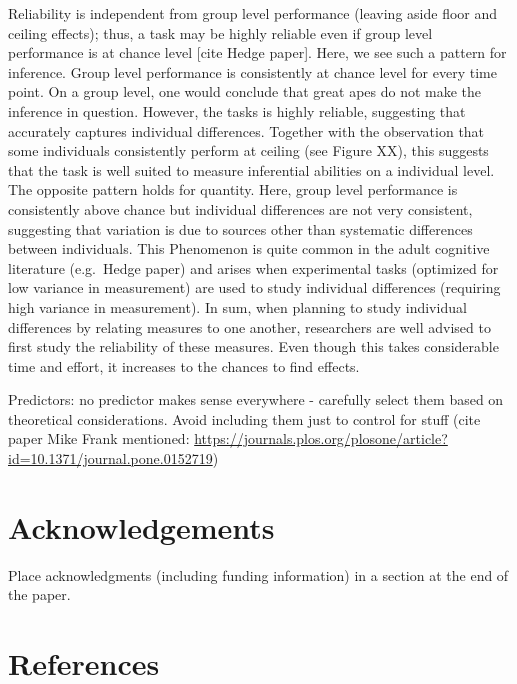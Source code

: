 \documentclass[10pt, letterpaper]{article}
\begin{document}
Reliability is independent from group level performance (leaving aside
floor and ceiling effects); thus, a task may be highly reliable even if
group level performance is at chance level {[}cite Hedge paper{]}. Here,
we see such a pattern for inference. Group level performance is
consistently at chance level for every time point. On a group level, one
would conclude that great apes do not make the inference in question.
However, the tasks is highly reliable, suggesting that accurately
captures individual differences. Together with the observation that some
individuals consistently perform at ceiling (see Figure XX), this
suggests that the task is well suited to measure inferential abilities
on a individual level. The opposite pattern holds for quantity. Here,
group level performance is consistently above chance but individual
differences are not very consistent, suggesting that variation is due to
sources other than systematic differences between individuals. This
Phenomenon is quite common in the adult cognitive literature (e.g.~Hedge
paper) and arises when experimental tasks (optimized for low variance in
measurement) are used to study individual differences (requiring high
variance in measurement). In sum, when planning to study individual
differences by relating measures to one another, researchers are well
advised to first study the reliability of these measures. Even though
this takes considerable time and effort, it increases to the chances to
find effects.

Predictors: no predictor makes sense everywhere - carefully select them
based on theoretical considerations. Avoid including them just to
control for stuff (cite paper Mike Frank mentioned:
\url{https://journals.plos.org/plosone/article?id=10.1371/journal.pone.0152719})

\hypertarget{acknowledgements}{%
\section{Acknowledgements}\label{acknowledgements}}

Place acknowledgments (including funding information) in a section at
the end of the paper.

\hypertarget{references}{%
\section{References}\label{references}}

\setlength{\parindent}{-0.1in} 
\setlength{\leftskip}{0.125in}

\noindent


\end{document}
